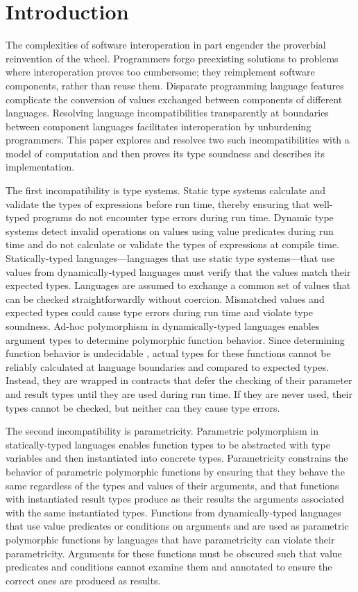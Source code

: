 \section{Introduction}

The complexities of software interoperation in part engender the proverbial reinvention of the wheel.  Programmers forgo preexisting solutions to problems where interoperation proves too cumbersome; they reimplement software components, rather than reuse them.  Disparate programming language features complicate the conversion of values exchanged between components of different languages.  Resolving language incompatibilities transparently at boundaries between component languages facilitates interoperation by unburdening programmers.  This paper explores and resolves two such incompatibilities with a model of computation and then proves its type soundness and describes its implementation.

The first incompatibility is type systems.  Static type systems calculate and validate the types of expressions before run time, thereby ensuring that well-typed programs do not encounter type errors during run time.  Dynamic type systems detect invalid operations on values using value predicates during run time and do not calculate or validate the types of expressions at compile time.  Statically-typed languages---languages that use static type systems---that use values from dynamically-typed languages must verify that the values match their expected types.  Languages are assumed to exchange a common set of values that can be checked straightforwardly without coercion.  Mismatched values and expected types could cause type errors during run time and violate type soundness.  Ad-hoc polymorphism in dynamically-typed languages enables argument types to determine polymorphic function behavior.  Since determining function behavior is undecidable \cite{blume04}, actual types for these functions cannot be reliably calculated at language boundaries and compared to expected types.  Instead, they are wrapped in contracts \cite{findler02} that defer the checking of their parameter and result types until they are used during run time.  If they are never used, their types cannot be checked, but neither can they cause type errors.

The second incompatibility is parametricity.  Parametric polymorphism in statically-typed languages enables function types to be abstracted with type variables and then instantiated into concrete types.  Parametricity constrains the behavior of parametric polymorphic functions by ensuring that they behave the same regardless of the types and values of their arguments, and that functions with instantiated result types produce as their results the arguments associated with the same instantiated types.  Functions from dynamically-typed languages that use value predicates or conditions on arguments and are used as parametric polymorphic functions by languages that have parametricity can violate their parametricity.  Arguments for these functions must be obscured such that value predicates and conditions cannot examine them and annotated to ensure the correct ones are produced as results.

